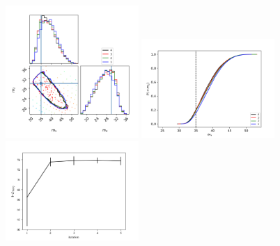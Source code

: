 \documentclass[twocolumn,prd,nofootinbib]{revtex4}
\begin{document}
\begin{figure}
\includegraphics[width=0.45\textwidth]{figures/bbh_zerospin_m1_m2.png}
\includegraphics[width=0.45\textwidth]{figures/bbh_zerospin_m1_cum.png}
\includegraphics[width=0.45\textwidth]{figures/bbh_zerospin_lnL_meanVar.png}

\end{figure}
\end{document}

